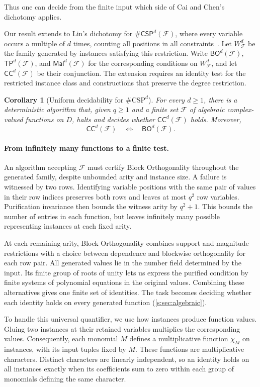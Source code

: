 \documentclass[11pt,letterpaper,onecolumn]{article}
\theoremstyle{plain}
\newtheorem{corollary}[corollary]{Corollary}
\theoremstyle{definition}
\theoremstyle{remark}
\newcommand{\cF}{\mathcal F}
\newcommand{\CC}{\mathsf{CC}}
\newcommand{\BO}{\mathsf{BO}}
\newcommand{\TP}{\mathsf{TP}}
\newcommand{\Mal}{\mathsf{Mal}}
\newcommand{\CSPdeg}[2]{\mathsf{\#CSP}^{#1}(#2)}
\newcommand{\WFdeg}[1]{W_{\cF}^{#1}}
\begin{document}
Thus one can decide from the finite input which side of Cai and Chen's
dichotomy applies.

Our result extends to Lin's dichotomy for $\CSPdeg{d}{\cF}$, where every
variable occurs a multiple of $d$ times, counting all positions in all
constraints~\cite[Theorem~3]{Lin2021}. Let $\WFdeg{d}$ be the family
generated by instances satisfying this restriction. Write
$\BO^d(\cF)$, $\TP^d(\cF)$, and $\Mal^d(\cF)$ for the corresponding
conditions on $\WFdeg{d}$, and let $\CC^d(\cF)$ be their conjunction.
The extension requires an identity test for the restricted instance class
and constructions that preserve the degree restriction.

\begin{corollary}[Uniform decidability for $\#\mathrm{CSP}^{d}$]
\label{s:cor:degree}
For every $d\ge1$, there is a deterministic algorithm that, given
$q\ge1$ and a finite set $\cF$ of algebraic complex-valued functions
on $D$, halts and decides whether $\CC^d(\cF)$ holds. Moreover,
\[
  \CC^d(\cF)\quad\Longleftrightarrow\quad\BO^d(\cF).
\]
\end{corollary}

\paragraph{From infinitely many functions to a finite test.}
An algorithm accepting $\cF$ must certify Block Orthogonality throughout
the generated family, despite unbounded arity and instance size.
A failure is witnessed by two rows.
Identifying variable positions with the same pair of values in their
row indices preserves both rows and leaves at most $q^2$ row variables.
Purification invariance then bounds the witness arity by $q^2+1$.
This bounds the number of entries in each function, but leaves
infinitely many possible representing instances at each fixed arity.

At each remaining arity, Block Orthogonality combines support and
magnitude restrictions with a choice between dependence and blockwise
orthogonality for each row pair. All generated values lie in the number
field determined by the input. Its finite group of roots of unity lets
us express the purified condition by finite systems of polynomial
equations in the original values. Combining these alternatives gives
one finite set of identities. The task becomes
deciding whether each identity holds on every generated function
(\cref{s:sec:algebraic}).

To handle this universal quantifier, we use how instances produce
function values. Gluing two instances at their retained variables
multiplies the corresponding values. Consequently, each monomial $M$
defines a multiplicative function $\chi_M$ on instances, with its input
tuples fixed by $M$. These functions are multiplicative characters.
Distinct characters are linearly independent, so an identity holds on
all instances exactly when its coefficients sum to zero within each
group of monomials defining the same character.
\end{document}

